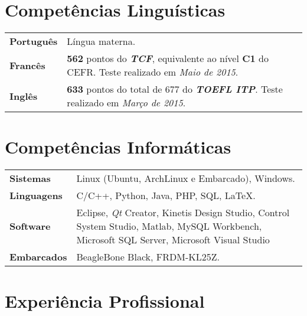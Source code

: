 \documentclass[10pt, a4paper]{article}
\begin{document}



\section{Competências Linguísticas}

\begin{tabular}{p{} p{}}

\textbf{Português} & Língua materna.  \\

\textbf{Francês} & \textbf{562} pontos do \textbf{\textit{TCF}},
equivalente ao nível \textbf{C1} do CEFR. Teste realizado em \textit{Maio
de 2015}.\\

\textbf{Inglês} & \textbf{633} pontos do total de 677 do \textbf{\textit{TOEFL
ITP}}. Teste realizado em \textit{Março de 2015}. \\

\end{tabular}


\section{Competências Informáticas}

\begin{tabular}{p{} p{}}

\textbf{Sistemas} & Linux (Ubuntu, ArchLinux e Embarcado), Windows.  \\

\textbf{Linguagens} & C/C++, Python, Java, PHP,  SQL, \LaTeX.  \\

\textbf{Software} & Eclipse, \textit{Qt} Creator, Kinetis Design Studio,
Control System Studio, Matlab, MySQL Workbench, Microsoft SQL Server, Microsoft
Visual Studio\\

\textbf{Embarcados} & BeagleBone Black, FRDM-KL25Z. \\

\end{tabular}


\section{Experiência Profissional}
\end{document}
